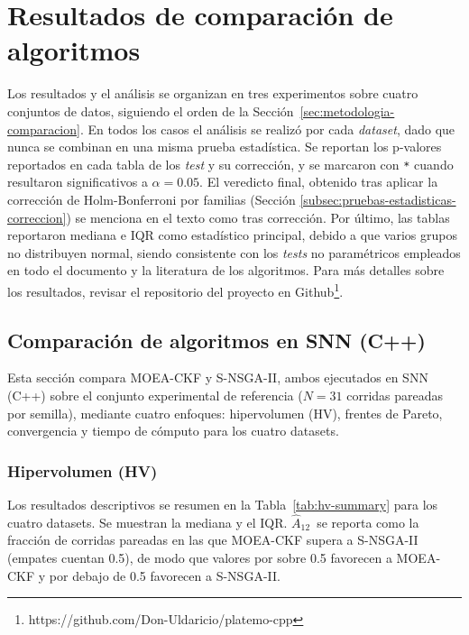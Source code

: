 

\providecommand{\Atwelve}{\ensuremath{\hat{A}_{12}}}

\section{Resultados de comparación de algoritmos}
\label{sec:resultados-discusion}

Los resultados y el análisis se organizan en tres experimentos sobre cuatro conjuntos de datos, siguiendo el orden de la Sección~\ref{sec:metodologia-comparacion}. En todos los casos el análisis se realizó por cada \textit{dataset}, dado que nunca se combinan en una misma prueba estadística. Se reportan los p-valores reportados en cada tabla de los \textit{test} y su corrección, y se marcaron con \texttt{*} cuando resultaron significativos a $\alpha=0.05$. El veredicto final, obtenido tras aplicar la corrección de Holm-Bonferroni por familias (Sección \ref{subsec:pruebas-estadisticas-correccion}) se menciona en el texto como tras corrección. Por último, las tablas reportaron mediana e IQR como estadístico principal, debido a que varios grupos no distribuyen normal, siendo consistente con los \textit{tests} no paramétricos empleados en todo el documento y la literatura de los algoritmos. Para más detalles sobre los resultados, revisar el repositorio del proyecto en Github\footnote{https://github.com/Don-Uldaricio/platemo-cpp}.

\subsection{Comparación de algoritmos en SNN (C++)}
\label{sec:experimento1}

Esta sección compara MOEA-CKF y S-NSGA-II, ambos ejecutados en SNN (C++) sobre el conjunto experimental de referencia ($N=31$ corridas pareadas por semilla), mediante cuatro enfoques: hipervolumen (HV), frentes de Pareto, convergencia y tiempo de cómputo para los cuatro datasets.

\subsubsection{Hipervolumen (HV)}\label{sec:hv}
Los resultados descriptivos se resumen en la Tabla~\ref{tab:hv-summary} para los cuatro datasets. Se muestran la mediana y el IQR. \Atwelve\ se reporta como la fracción de corridas pareadas en las que MOEA-CKF supera a S-NSGA-II (empates cuentan 0.5), de modo que valores por sobre 0.5 favorecen a MOEA-CKF y por debajo de 0.5 favorecen a S-NSGA-II.

